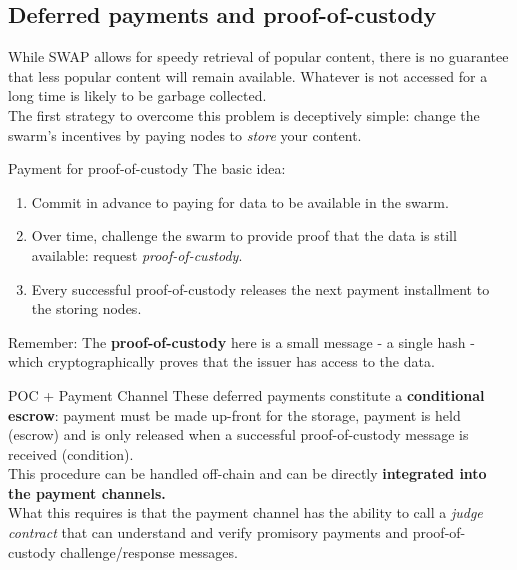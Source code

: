 \subsection[pay-as-you-store]{Deferred payments and proof-of-custody}
\begin{frame}{}
While SWAP allows for speedy retrieval of popular content, there is no guarantee that less popular content will remain available. Whatever is not accessed for a long time is likely to be garbage collected.\\
The first strategy to overcome this problem is deceptively simple: change the swarm's incentives by paying nodes to \emph{store} your content.
\end{frame}
\begin{frame}{Payment for proof-of-custody}
The basic idea:
\begin{enumerate}
 \item Commit in advance to paying for data to be available in the swarm.
 \item Over time, challenge the swarm to provide proof that the data is still available: request \emph{proof-of-custody}.
 \item Every successful proof-of-custody releases the next payment installment to the storing nodes.
\end{enumerate}
\begin{block}{Remember:}
 The \textbf{proof-of-custody} here is a small message - a single hash - which cryptographically proves that the issuer has access to the data.
\end{block}
\end{frame}
\begin{frame}{POC + Payment Channel}
 These deferred payments constitute a \textbf{conditional escrow}: payment must be made up-front for the storage, payment is held (escrow) and is only released when a successful proof-of-custody message is received (condition).\\[5mm]
 This procedure can be handled off-chain and can be directly \textbf{integrated into the payment channels.}\\[5mm]
 What this requires is that the payment channel has the ability to call a \emph{judge contract} that can understand and verify promisory payments and proof-of-custody challenge/response messages.
\end{frame}


